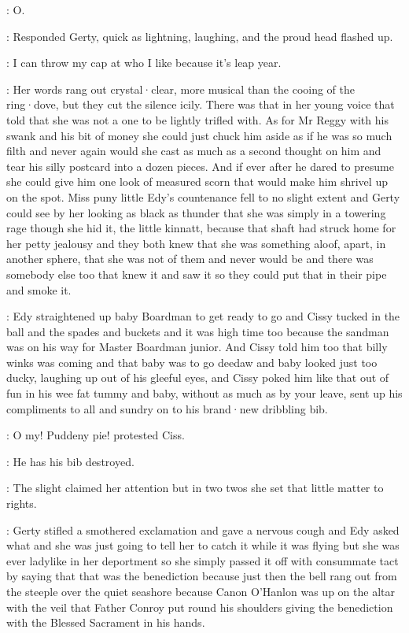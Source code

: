 \gerty:
O.

:
Responded Gerty,
quick as lightning,
laughing,
and the proud head flashed up.

\gerty:
I can throw my cap at who I like
because it's leap year.

:
Her words rang out crystal·clear,
more musical
than the cooing of the ring·dove,
but they cut the silence icily.
There was that
in her young voice
that told
that she was not a one
to be lightly trifled with.
As for Mr Reggy
with his swank and his bit of money
she could just chuck him aside
as if he was so much filth
and never again
would she cast
as much as a second thought on him
and tear his silly postcard into a dozen pieces.
And if ever after
he dared to presume
she could give him one look of measured scorn
that would make him
shrivel up on the spot.
Miss puny little Edy's countenance fell
to no slight extent
and Gerty could see
by her looking as black as thunder
that she was simply in a towering rage
though she hid it,
the little kinnatt,
because that shaft had struck home
for her petty jealousy
and they both knew
that she was something aloof,
apart,
in another sphere,
that she was not of them
and never would be
and there was somebody else too
that knew it
and saw it
so they could put that in their pipe
and smoke it.

:
Edy straightened up baby Boardman
to get ready to go
and Cissy tucked in
the ball and the spades and buckets
and it was high time too
because the sandman
was on his way for Master Boardman junior.
And Cissy told him too
that billy winks was coming
and that baby was to go deedaw
and baby looked just too ducky,
laughing up out of his gleeful eyes,
and Cissy poked him like that
out of fun
in his wee fat tummy
and baby,
without as much as by your leave,
sent up his compliments
to all and sundry
on to his brand·new dribbling bib.

\cissy:
O my!
Puddeny pie!
protested Ciss.

\cissy:
He has his bib destroyed.

:
The slight 
claimed her attention
but in two twos
she set that little matter to rights.

:
Gerty stifled a smothered exclamation
and gave a nervous cough
and Edy asked what
and she was just going to tell her
to catch it while it was flying
but she was ever ladylike in her deportment
so she simply passed it off
with consummate tact
by saying that that was the benediction
because just then
the bell rang out from the steeple
over the quiet seashore
because Canon O'Hanlon
was up on the altar
with the veil
that Father Conroy put round his shoulders
giving the benediction
with the Blessed Sacrament in his hands.

